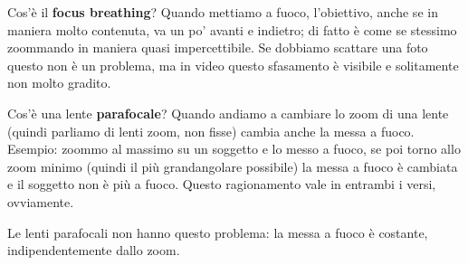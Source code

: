 Cos'è il \textbf{focus breathing}?
Quando mettiamo a fuoco, l'obiettivo, anche se in maniera molto contenuta, va un po' avanti e indietro; di fatto è come se stessimo zoommando in maniera quasi impercettibile.
Se dobbiamo scattare una foto questo non è un problema, ma in video questo sfasamento è visibile e solitamente non molto gradito.

Cos'è una lente \textbf{parafocale}?
Quando andiamo a cambiare lo zoom di una lente (quindi parliamo di lenti zoom, non fisse) cambia anche la messa a fuoco.
Esempio: zoommo al massimo su un soggetto e lo messo a fuoco, se poi torno allo zoom minimo (quindi il più grandangolare possibile) la messa a fuoco è cambiata e il soggetto non è più a fuoco.
Questo ragionamento vale in entrambi i versi, ovviamente.

Le lenti parafocali non hanno questo problema: la messa a fuoco è costante, indipendentemente dallo zoom.

